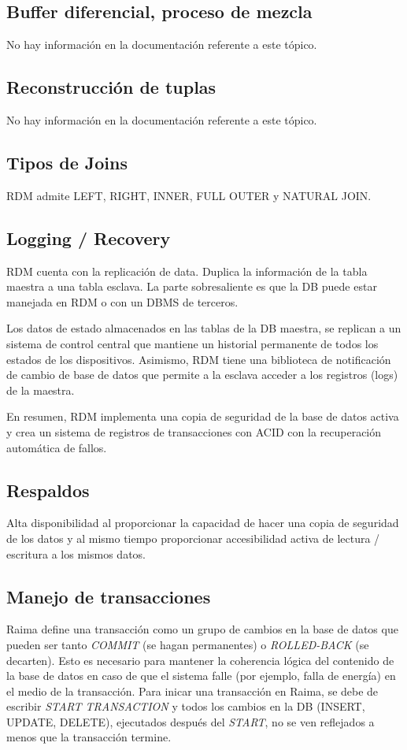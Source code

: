 \documentclass{acmart}
\begin{document}
\subsection{Buffer diferencial, proceso de mezcla}
No hay información en la documentación referente a este tópico.
\subsection{Reconstrucción de tuplas}
No hay información en la documentación referente a este tópico.
\subsection{Tipos de Joins}
RDM admite LEFT, RIGHT, INNER, FULL OUTER y NATURAL JOIN. \cite{Rjoin}
\subsection{Logging / Recovery}
RDM cuenta con la replicación de data. Duplica la información de la tabla maestra a una tabla esclava. La parte sobresaliente es que la DB puede estar manejada en RDM o con un DBMS de terceros.

Los datos de estado almacenados en las tablas de la DB maestra, se replican a un sistema de control central que mantiene un historial permanente de todos los estados de los dispositivos. Asimismo, RDM tiene una biblioteca de notificación de cambio de base de datos que permite a la esclava acceder a los registros (logs) de la maestra.

En resumen, RDM implementa una copia de seguridad de la base de datos activa y crea un sistema de registros de transacciones con ACID con la recuperación automática de fallos. \cite{Rserv, Rwiki}
\subsection{Respaldos}
Alta disponibilidad al proporcionar la capacidad de hacer una copia de seguridad de los datos y al mismo tiempo proporcionar accesibilidad activa de lectura / escritura a los mismos datos. \cite{Rpdf2}
\subsection{Manejo de transacciones}
Raima define una transacción como un grupo de cambios en la base de datos que pueden ser tanto \textit{COMMIT} (se hagan permanentes) o \textit{ROLLED-BACK} (se decarten). Esto es necesario para mantener la coherencia lógica del contenido de la base de datos en caso de que el sistema falle (por ejemplo, falla de energía) en el medio de la transacción. Para inicar una transacción en Raima, se debe de escribir \textit{START TRANSACTION} y todos los cambios en la DB (INSERT, UPDATE, DELETE), ejecutados después del \textit{START}, no se ven reflejados a menos que la transacción termine. 
\end{document}
